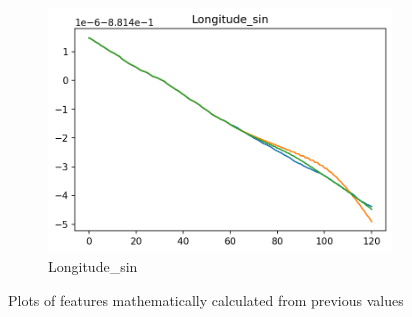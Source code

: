 \begin{figure}[ht]
\begin{subfigure}[b]{0.32\textwidth}
         \includegraphics[width=\textwidth]{figures/prediction-plots-joint/Longitude_sin.png}
         \caption{Longitude\_sin}
     \end{subfigure}
        \caption{Plots of features mathematically calculated from previous values}
        \label{fig:prediction-math-joint}
\end{figure}